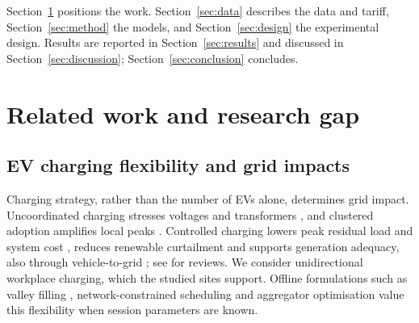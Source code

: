 Section~\ref{sec:lit} positions the work. Section~\ref{sec:data} describes the data and tariff, Section~\ref{sec:method} the models, and Section~\ref{sec:design} the experimental design. Results are reported in Section~\ref{sec:results} and discussed in Section~\ref{sec:discussion}; Section~\ref{sec:conclusion} concludes.

\section{Related work and research gap}\label{sec:lit}
\subsection{EV charging flexibility and grid impacts}
Charging strategy, rather than the number of EVs alone, determines grid impact. Uncoordinated charging stresses voltages and transformers \cite{ClementNyns2010,Putrus2009Impact,Gong2012Transformer}, and clustered adoption amplifies local peaks \cite{Muratori2018Uncoordinated,Fischer2019Residential,KamanaWilliams2024Peak}. Controlled charging lowers peak residual load and system cost \cite{Hanemann2017Strategies,Schill2015Germany,Mangipinto2022Europe,Crozier2020SmartCharging,Heuberger2020EVolution,Strobel2022Regional}, reduces renewable curtailment \cite{Szinai2020GridCosts,Denholm2013PV} and supports generation adequacy, also through vehicle-to-grid \cite{Kempton2005Fundamentals,Kempton2005Implementation,Frank2025Germany,Lauvergne2022Adequacy}; see \cite{Richardson2013Review,Li2026UltraFast} for reviews. We consider unidirectional workplace charging, which the studied sites support. Offline formulations such as valley filling \cite{Chen2014ValleyFilling}, network-constrained scheduling \cite{deHoog2015Network} and aggregator optimisation \cite{Rivera2017Aggregators} value this flexibility when session parameters are known.

